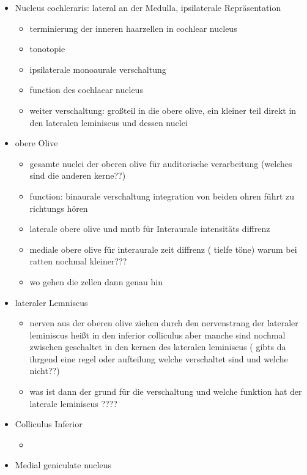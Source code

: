 \documentclass[12pt,a4paper,pdftex]{article}
\begin{document}
\begin{itemize}
    \item Nucleus cochleraris: lateral an der Medulla, ipsilaterale Repräsentation
    \begin{itemize}
        \item terminierung der inneren haarzellen in cochlear nucleus 
        \item tonotopie 
        \item ipsilaterale monoaurale verschaltung
        \item function des cochlaear nucleus
        \item weiter verschaltung: großteil in die obere olive, ein kleiner teil direkt in den lateralen leminiscus und dessen nuclei 
    \end{itemize}
    \item obere Olive
    \begin{itemize}
        \item gesamte nuclei der oberen olive für auditorische verarbeitung (welches sind die anderen kerne??)
        \item function: binaurale verschaltung integration von beiden ohren führt zu richtungs hören
        \item laterale obere olive und mntb für Interaurale intensitäts diffrenz
        \item mediale obere olive für interaurale zeit diffrenz ( tielfe töne) warum bei ratten nochmal kleiner???
        \item wo gehen die zellen dann genau hin
    \end{itemize}
    \item lateraler Lemniscus
    \begin{itemize}
        \item nerven aus der oberen olive ziehen durch den nervenstrang der lateraler leminiscus heißt in den inferior colliculus aber manche sind nochmal zwischen geschaltet in den kernen des lateralen leminiscus ( gibts da ihrgend eine regel oder aufteilung welche verschaltet sind und welche nicht??)
        \item was ist dann der grund für die verschaltung und welche funktion hat der laterale leminiscus ????
    \end{itemize}
    \item Colliculus Inferior
    \begin{itemize}
        \item 
    \end{itemize}
    \item Medial geniculate nucleus
\end{itemize}
\end{document}
